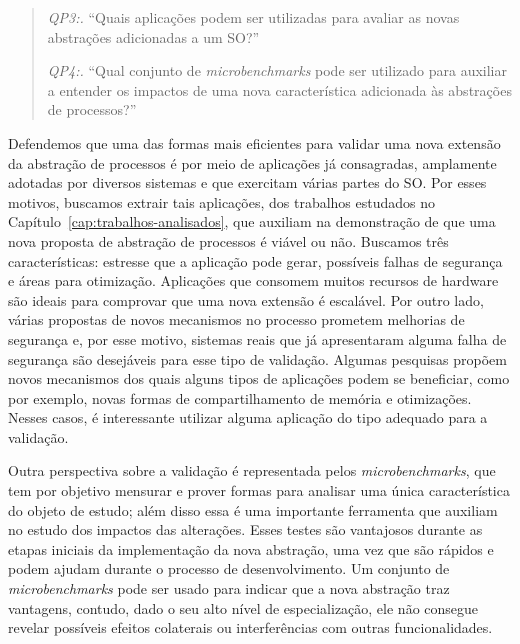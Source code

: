 \begin{quote}
  \item \emph{QP3:.} ``Quais aplicações podem ser utilizadas para avaliar as novas abstrações adicionadas a um SO?''
  \item \emph{QP4:.} ``Qual conjunto de \emph{microbenchmarks} pode ser utilizado para auxiliar a entender os impactos de uma nova característica adicionada às abstrações de processos?''
\end{quote}

Defendemos que uma das formas mais eficientes para validar uma nova extensão da
abstração de processos é por meio de aplicações já consagradas, amplamente adotadas por
diversos sistemas e que exercitam várias partes do SO. Por esses motivos,
buscamos extrair tais aplicações, dos trabalhos estudados no
Capítulo~\ref{cap:trabalhos-analisados}, que auxiliam na demonstração de que uma nova
proposta de abstração de processos é viável ou não. Buscamos três
características: estresse que a aplicação pode gerar, possíveis falhas de
segurança e áreas para otimização. Aplicações que consomem muitos recursos de
hardware são ideais para comprovar que uma nova extensão é escalável. Por outro
lado, várias propostas de novos mecanismos no processo prometem melhorias de
segurança e, por esse motivo, sistemas reais que já apresentaram alguma falha
de segurança são desejáveis para esse tipo de validação. Algumas pesquisas
propõem novos mecanismos dos quais alguns tipos de aplicações podem se
beneficiar, como por exemplo, novas formas de compartilhamento de memória e
otimizações. Nesses casos, é interessante utilizar alguma aplicação do tipo
adequado para a validação.

Outra perspectiva sobre a validação é representada pelos
\emph{microbenchmarks}, que tem por objetivo mensurar e prover formas para
analisar uma única característica do objeto de estudo; além disso essa é uma
importante ferramenta que auxiliam no estudo dos impactos das alterações.
Esses testes são vantajosos durante as etapas iniciais da implementação da nova
abstração, uma vez que são rápidos e podem ajudam durante o processo de
desenvolvimento. Um conjunto de \emph{microbenchmarks} pode ser usado para
indicar que a nova abstração traz vantagens, contudo, dado o seu alto nível de
especialização, ele não consegue revelar possíveis efeitos colaterais ou
interferências com outras funcionalidades.

